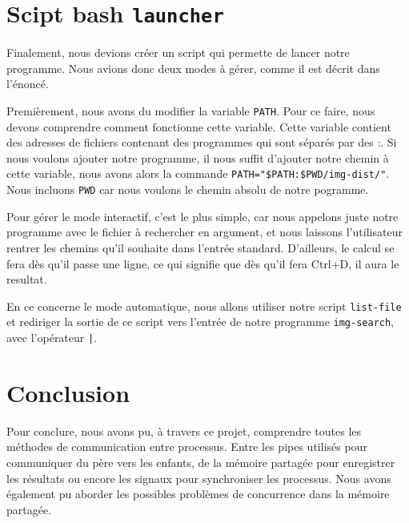 \documentclass[french]{article}
\begin{document}
\section{Scipt bash \texttt{launcher}}
Finalement, nous devions créer un script qui permette de lancer notre programme. Nous avions donc deux modes à gérer, comme il est décrit dans l'énoncé. 

Premièrement, nous avons du modifier la variable \texttt{PATH}. Pour ce faire, nous devons comprendre comment fonctionne cette variable. Cette variable contient des 
adresses de fichiers contenant des programmes qui sont séparés par des :. Si nous voulons ajouter notre programme, il nous suffit d'ajouter notre chemin à cette 
variable, nous avons alors la commande \texttt{PATH="\$PATH:\$PWD/img-dist/"}. Nous incluons \texttt{PWD} car nous voulons le chemin absolu de notre pogramme. 

Pour gérer le mode interactif, c'est le plus simple, car nous appelons juste notre programme avec le fichier à rechercher en argument, et nous laissons l'utilisateur 
rentrer les chemins qu'il souhaite dans l'entrée standard. D'ailleurs, le calcul se fera dès qu'il passe une ligne, ce qui signifie que dès qu'il fera Ctrl+D, 
il aura le resultat. 

En ce concerne le mode automatique, nous allons utiliser notre script \texttt{list-file} et rediriger la sortie de ce script vers l'entrée 
de notre programme \texttt{img-search}, avec l'opérateur \texttt{|}. 

\section{Conclusion}
Pour conclure, nous avons pu, à travers ce projet, comprendre toutes les méthodes de communication entre processus. Entre les pipes utilisés pour communiquer du 
père vers les enfants, de la mémoire partagée pour enregistrer les résultats ou encore les signaux pour synchroniser les processus. Nous avons également pu 
aborder les possibles problèmes de concurrence dans la mémoire partagée.
\end{document}
